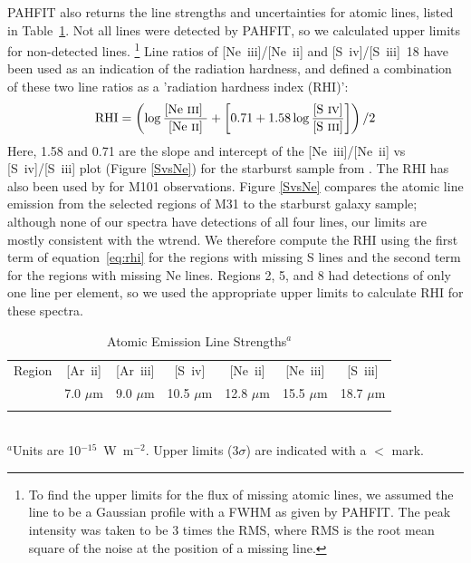 PAHFIT also returns the line strengths and uncertainties for atomic lines, listed in Table~\ref{Atomic}.
Not all lines were detected by PAHFIT, so we calculated upper limits for non-detected lines.%
\footnote{To find  the upper limits for the flux of missing atomic lines, we assumed the line to be a 
Gaussian profile with a FWHM as given by PAHFIT. The peak intensity was taken to be 3 times the RMS, where RMS is the root mean square of 
the noise at the position of a missing line.}
Line ratios of [Ne~{\sc iii}]/[Ne~{\sc ii}] and [S~{\sc iv}]/[S~{\sc iii}]~18 have been used as an indication of the radiation hardness, and
\citet{Engelbracht_2008} defined a combination of these two line ratios as a 'radiation hardness index (RHI)':
\begin{equation}
{\rm RHI} = \left( \log\frac{\textrm{[Ne~{\sc iii}] }}{\textrm{[Ne~{\sc ii}]}} + \left[0.71 + 1.58\log\frac{\textrm{{[S~{\sc iv}]}}}{\textrm{{[S~{\sc iii}]}}}\right]\right) /2
\end{equation}
\label{eq:rhi}
Here, 1.58 and 0.71 are the slope and intercept of the [Ne~{\sc iii}]/[Ne~{\sc ii}]  vs [S~{\sc iv}]/[S~{\sc iii}] plot (Figure \ref{SvsNe}) for the starburst sample from 
\citet{Engelbracht_2008}. The RHI has also been used by \citet{Gordon:2008lr} for M101 observations. 
Figure \ref{SvsNe}  compares the atomic line emission from the selected regions of M31 to the starburst galaxy sample;
although none of our spectra have detections of all four lines, our limits are mostly consistent with the wtrend.
We therefore compute the RHI using the first term of equation~\ref{eq:rhi} for the regions with missing S lines
and the second term for the regions with missing Ne lines.
Regions 2, 5, and 8 had detections of only one line per element, so we used the appropriate upper limits 
to calculate RHI for these spectra.


\begin{table}
 \centering
 \begin{minipage}{100mm}
\caption{Atomic Emission Line Strengths$^a$}
  \begin{tabular}{l c c  c  c  c  c  }
  \hline
  {Region  }&{[Ar~{\sc ii}] }&{[Ar~{\sc iii}]  }&{[S~{\sc iv}]}&{[Ne~{\sc ii}]   }&{[Ne~{\sc iii}]   }&{[S~{\sc iii}]  }\\
{}&{\tiny{7.0 $\mu$m} }&{\tiny{9.0 $\mu$m }}&{\tiny{10.5 $\mu$m}}&{\tiny{12.8 $\mu$m  }}&{\tiny{15.5 $\mu$m } }&{\tiny{18.7 $\mu$m }} \\
 \hline 
  
\hline
 \label{Atomic}
\end{tabular}\\
{ $^a$Units are 10$^{-15}$~W~m$^{-2}$. Upper limits ($3\sigma$) are indicated with a $<$ mark.  }
\end{minipage}
\end{table}

